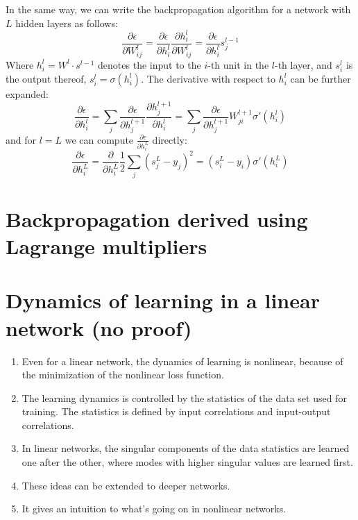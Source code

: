 \documentclass[11pt]{book} %
\begin{document}
In the same way, we can write the backpropagation algorithm for a network with $L$ hidden layers as follows:
\begin{equation}
    \frac{\partial \epsilon}{\partial W_{ij}^l} = \frac{\partial \epsilon}{\partial h_i^l} \frac{\partial h_i^l}{\partial W_{ij}^l} = 
    \frac{\partial \epsilon}{\partial h_i^l} s_j^{l-1}
\end{equation}
Where \( h_i^l = W^l \cdot s^{l-1} \) denotes the input to the \( i \)-th unit in the \( l \)-th layer, and \( s_i^l \) is the output thereof,
 \( s_i^l = \sigma (h_i^l) \). The derivative with respect to \( h_i^l \) can be further expanded:
\begin{equation}
    \frac{\partial \epsilon}{\partial h_i^l} = \sum_j \frac{\partial \epsilon}{\partial h_{j}^{l+1}} \frac{\partial h_{j}^{l+1}}{\partial h_i^l} = 
    \sum_j \frac{\partial \epsilon}{\partial h_{j}^{l+1}} W_{ji}^{l+1} \sigma'(h_i^l) 
\end{equation}
and for \( l = L \) we can compute \( \frac{\partial \epsilon}{\partial h_{i}^L} \) directly:
\begin{equation}
    \frac{\partial \epsilon}{\partial h_{i}^L} = \frac{\partial}{\partial h_{i}^L} \frac{1}{2} \sum_j (s_j^L - y_j)^2 = (s_i^L - y_i) \sigma'(h_i^L) 
\end{equation}


%
%
%

\section{Backpropagation derived using Lagrange multipliers}


%
%
%

\section{Dynamics of learning in a linear network (no proof)}

\begin{enumerate}
    \item Even for a linear network, the dynamics of learning is nonlinear, because of the minimization of the nonlinear loss function.
    \item The learning dynamics is controlled by the statistics of the data set used for training. The statistics is defined by input correlations and input-output correlations.
    \item In linear networks, the singular components of the data statistics are learned one after the other, where modes with higher singular values are learned first.
    \item These ideas can be extended to deeper networks.
    \item It gives an intuition to what's going on in nonlinear networks.
\end{enumerate}
\end{document}
